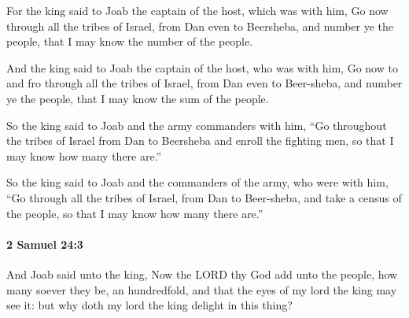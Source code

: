 			For the king said to Joab the captain of the host, which was with him, Go now through all the tribes of Israel, from Dan even to Beersheba, and number ye the people, that I may know the number of the people.

			\begin{versebox}
					\item[BHS] 
					\item[ASV] And the king said to Joab the captain of the host, who was with him, Go now to and fro through all the tribes of Israel, from Dan even to Beer-sheba, and number ye the people, that I may know the sum of the people.
					\item[NIV] So the king said to Joab and the army commanders with him, “Go throughout the tribes of Israel from Dan to Beersheba and enroll the fighting men, so that I may know how many there are.”
					\item[NRSV] So the king said to Joab and the commanders of the army, who were with him, “Go through all the tribes of Israel, from Dan to Beer-sheba, and take a census of the people, so that I may know how many there are.”
			\end{versebox}

		\paragraph{2 Samuel 24:3} %
			\label{2SAMUEL-24-3}

			And Joab said unto the king, Now the LORD thy God add unto the people, how many soever they be, an hundredfold, and that the eyes of my lord the king may see it: but why doth my lord the king delight in this thing?

